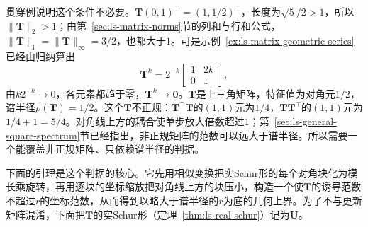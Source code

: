 贯穿例说明这个条件不必要。$\bm T(0,1)^\top=(1,1/2)^\top$，长度为$\sqrt5/2>1$，所以$\lVert\bm T\rVert_2>1$；由第~\ref{sec:ls-matrix-norms}节的列和与行和公式，$\lVert\bm T\rVert_1=\lVert\bm T\rVert_\infty=3/2$，也都大于$1$。可是示例~\ref{ex:ls-matrix-geometric-series}已经由归纳算出
\[
 \bm T^k=2^{-k}\begin{bmatrix}1&2k\\0&1\end{bmatrix},
\]
由$k2^{-k}\to0$，各元素都趋于零，$\bm T^k\to\bm0$。$\bm T$是上三角矩阵，特征值为对角元$1/2$，谱半径$\rho(\bm T)=1/2$。这个$\bm T$不正规：$\bm T^\top\bm T$的$(1,1)$元为$1/4$，$\bm T\bm T^\top$的$(1,1)$元为$1/4+1=5/4$。对角线上方的耦合使单步放大倍数超过$1$；第~\ref{sec:ls-general-square-spectrum}节已经指出，非正规矩阵的范数可以远大于谱半径。所以需要一个能覆盖非正规矩阵、只依赖谱半径的判据。

下面的引理是这个判据的核心。它先用相似变换把实Schur形的每个对角块化为模长乘旋转，再用逐块的坐标缩放把对角线上方的块压小，构造一个使$\bm T$的诱导范数不超过$r$的坐标范数，从而得到以略大于谱半径的$r$为底的几何上界。为了不与更新矩阵混淆，下面把$\bm T$的实Schur形（定理~\ref{thm:ls-real-schur}）记为$\bm U$。

